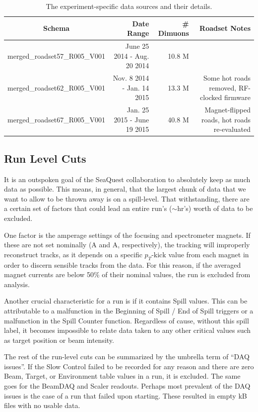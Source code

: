 \begin{table}
	\centering
	\caption{The experiment-specific data sources and their details.}
	\label{tab:roadset-stats}
	\begin{tabular}{c|rrr}
		Schema & Date Range & \# Dimuons & Roadset Notes\\	
		\hline
		merged\_roadset57\_R005\_V001 & June 25 2014 - Aug. 20 2014 & 10.8 M &  \\
		merged\_roadset62\_R005\_V001 & Nov. 8 2014 - Jan. 14 2015 & 13.3 M & Some hot roads removed, RF-clocked firmware \\
		merged\_roadset67\_R005\_V001 & Jan. 25 2015 - June 19 2015 & 40.8 M & Magnet-flipped roads, hot roads re-evaluated
	\end{tabular}
\end{table}

\subsection{Run Level Cuts}

It is an outspoken goal of the SeaQuest collaboration to absolutely keep as much data as possible. This means, in general, that the largest chunk of data that we want to allow to be thrown away is on a spill-level. That withstanding, there are a certain set of factors that could lead an entire run's ($\sim$\unit[1]{hr}'s) worth of data to be excluded.

One factor is the amperage settings of the focusing and spectrometer magnets. If these are not set nominally (\unit[2000]{A} and \unit[1600]{A}, respectively), the tracking will improperly reconstruct tracks, as it depends on a specific $p_T\text{-kick}$ value from each magnet in order to discern sensible tracks from the data. For this reason, if the averaged magnet currents are below 50\% of their nominal values, the run is excluded from analysis.

Another crucial characteristic for a run is if it contains Spill values. This can be attributable to a malfunction in the Beginning of Spill / End of Spill triggers or a malfunction in the Spill Counter function. Regardless of cause, without this spill label, it becomes impossible to relate data taken to any other critical values such as target position or beam intensity.

The rest of the run-level cuts can be summarized by the umbrella term of ``DAQ issues''. If the Slow Control failed to be recorded for any reason and there are zero Beam, Target, or Environment table values in a run, it is excluded. The same goes for the BeamDAQ and Scaler readouts. Perhaps most prevalent of the DAQ issues is the case of a run that failed upon starting. These resulted in empty \unit[32]{kB} files with no usable data.


